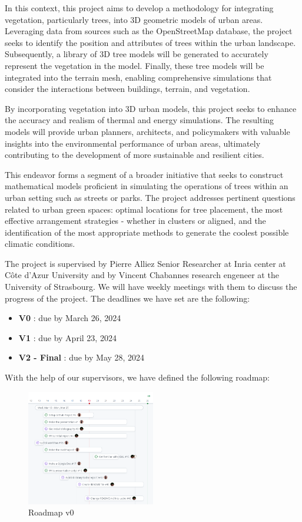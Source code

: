 \documentclass[12pt]{article}
\begin{document}
In this context, this project aims to develop a methodology for integrating 
vegetation, particularly trees, into 3D geometric models of urban areas. Leveraging 
data from sources such as the OpenStreetMap database, the project seeks to identify 
the position and attributes of trees within the urban landscape. Subsequently, a 
library of 3D tree models will be generated to accurately represent the vegetation 
in the model. Finally, these tree models will be integrated into the terrain mesh, 
enabling comprehensive simulations that consider the interactions between buildings, 
terrain, and vegetation.

By incorporating vegetation into 3D urban models, this project seeks to enhance the 
accuracy and realism of thermal and energy simulations. The resulting models will 
provide urban planners, architects, and policymakers with valuable insights into 
the environmental performance of urban areas, ultimately contributing to the 
development of more sustainable and resilient cities.

This endeavor forms a segment of a broader initiative that seeks to construct
mathematical models proficient in simulating the operations of trees within an
urban setting such as streets or parks. The project addresses pertinent
questions related to urban green spaces: optimal locations for tree placement,
the most effective arrangement strategies - whether in clusters or aligned,
and the identification of the most appropriate methods to generate the coolest
possible climatic conditions.

The project is supervised by Pierre Alliez
Senior Researcher at Inria center at Côte d'Azur University
and by Vincent Chabannes research engeneer at the University of Strasbourg.
We will have weekly meetings with them to discuss the progress of the project.
The deadlines we have set are the following:
\begin{itemize}
    \item \textbf{V0} : due by March 26, 2024
    \item \textbf{V1} : due by April 23, 2024
    \item \textbf{V2 - Final} : due by May 28, 2024
\end{itemize}

With the help of our supervisors, we have defined the following roadmap:

\begin{figure}[H]
    \centering
    \includegraphics[width=0.5\textwidth]{images/roadmap_v0.png}
    \caption{Roadmap v0}
\end{figure}
\end{document}
